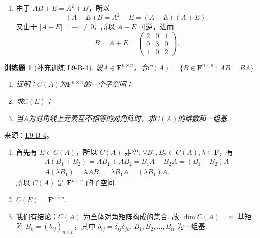 \documentclass[UTF8,12pt,a4paper,fontset=fandol]{ctexart}
\newtheorem{exercise}{训练题}[section]
\begin{document}
\begin{solve}
\begin{enumerate}
                \item 由于 $ AB + E = A^2 + B $，所以
                      \[ (A - E)B = A^2 - E = (A - E)(A + E). \]
                      又由于 $ |A - E| = -1 \neq 0 $，所以 $ A - E $ 可逆，进而
                      \[ B = A + E = \begin{pmatrix}
                              2 & 0 & 1 \\
                              0 & 3 & 0 \\
                              1 & 0 & 2
                          \end{pmatrix}. \]
            \end{enumerate}
\end{solve}

\begin{exercise}[补充训练 L9-B-4]\label{prob:L9-B-4}
设$A \in \mathbf{F}^{n \times n}$，令$C(A)=\{B \in \mathbf{F}^{n \times n} \mid AB=BA\}$.
        \begin{enumerate}
            \item 证明：$C(A)$为$\mathbf{F}^{n \times n}$的一个子空间；

            \item 求$C(E)$；

            \item 当$A$为对角线上元素互不相等的对角阵时，求$C(A)$的维数和一组基.
        \end{enumerate}
\end{exercise}
\noindent 来源：\href{https://github.com/yhwu-is/Linear-Algebra-Left-Undone/blob/new/%E8%AE%B2%E4%B9%89/%E4%B8%93%E9%A2%98/9%20%E7%9F%A9%E9%98%B5%E8%BF%90%E7%AE%97%E8%BF%9B%E9%98%B6.tex}{L9-B-4}。
\begin{solve}
\begin{enumerate}
                \item 首先有 $ E \in C(A) $，所以 $ C(A) $ 非空. $ \forall B_1, B_2 \in C(A), \lambda \in \mathbf{F} $，有
                      \begin{gather*}
                          A(B_1 + B_2) = AB_1 + AB_2 = B_1A + B_2A = (B_1 + B_2)A \\
                          A(\lambda B_1) = \lambda AB_1 = \lambda B_1A = (\lambda B_1)A.
                      \end{gather*}
                      所以 $ C(A) $ 是 $ \mathbf{F}^{n \times n} $ 的子空间.

                \item $ C(E) = \mathbf{F}^{n \times n} $.

                \item 我们有结论：$ C(A) $ 为全体对角矩阵构成的集合. 故 $ \dim C(A) = n $. 基矩阵 $ B_k = (b_{ij})_{n \times n} $，其中 $ b_{ij} = \delta_{ij} \delta_{jk} $. $ B_1, B_2, \ldots, B_n $ 为一组基.
            \end{enumerate}
\end{solve}
\end{document}
